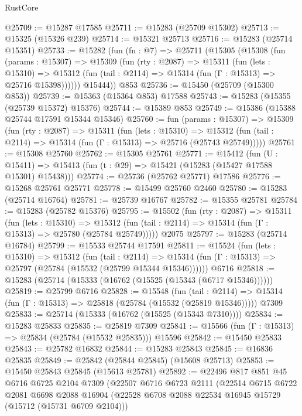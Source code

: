 \begin{lexlean}{RustCore}
\begin{coremodule}
@25709 := @15287 @17585
@25711 := @15283 (@25709 @15302)
@25713 := @15325 (@15326 @239)
@25714 := @15321 @25713
@25716 := @15283 (@25714 @15351)
@25733 := @15282
    (fun (fn : @7) =>
    @25711
      (@15305
        (@15308
          (fun (params : @15307) =>
          @15309
            (fun (rty : @2087) =>
            @15311
              (fun (lets : @15310) =>
              @15312 (fun (tail : @2114) => @15314 (fun (Γ : @15313) => @25716 @15398))))))
        @15444))
    @853
@25736 := @15450 (@25709 (@15300 @853))
@25739 := @15363 (@15364 @853) @17588
@25743 := @15283 (@15355 (@25739 @15372) @15376)
@25744 := @15389 @853
@25749 := @15386 (@15388 @25744 @17591 @15344 @15346)
@25760 := fun (params : @15307) =>
  @15309
    (fun (rty : @2087) =>
    @15311
      (fun (lets : @15310) =>
      @15312 (fun (tail : @2114) => @15314 (fun (Γ : @15313) => @25716 (@25743 @25749)))))
@25761 := @15308 @25760
@25762 := @15305 @25761
@25771 := @15412
    (fun (U : @15411) => @15413 (fun (t : @29) => @15421 (@15283 (@15427 @17588 @15301) @15438)))
@25774 := @25736 (@25762 @25771) @17586
@25776 := @15268 @25761 @25771
@25778 := @15499 @25760 @2460
@25780 := @15283 (@25714 @16764)
@25781 := @25739 @16767
@25782 := @15355 @25781
@25784 := @15283 (@25782 @15376)
@25795 := @15502
    (fun (rty : @2087) =>
    @15311
      (fun (lets : @15310) =>
      @15312 (fun (tail : @2114) => @15314 (fun (Γ : @15313) => @25780 (@25784 @25749)))))
    @2075
@25797 := @15283 (@25714 @16784)
@25799 := @15533 @25744 @17591
@25811 := @15524
    (fun (lets : @15310) =>
    @15312
      (fun (tail : @2114) =>
      @15314 (fun (Γ : @15313) => @25797 (@25784 (@15532 (@25799 @15344 @15346))))))
    @6716
@25818 := @15283 (@25714 (@15333 (@16762 (@15525 (@15343 (@6717 @15346))))))
@25819 := @25799 @6716
@25828 := @15548
    (fun (tail : @2114) => @15314 (fun (Γ : @15313) => @25818 (@25784 (@15532 (@25819 @15346)))))
    @7309
@25833 := @25714 (@15333 (@16762 (@15525 (@15343 @7310))))
@25834 := @15283 @25833
@25835 := @25819 @7309
@25841 := @15566 (fun (Γ : @15313) => @25834 (@25784 (@15532 @25835))) @15596
@25842 := @15450 @25833
@25843 := @25782 @16832
@25844 := @15283 @25843
@25845 := @16836 @25835
@25849 := @25842 (@25844 @25845) (@15608 @25713)
@25853 := @15450 @25843 @25845 (@15613 @25781)
@25892 := @22496
    @817
    @851
    @45
    @6716
    @6725
    @2104
    @7309
    (@22507
      @6716
      @6723
      @2111
      (@22514
        @6715
        @6722
        @2081
        @6698
        @2088
        @16904
        (@22528 @6708 @2088 @22534 @16945 @15729 (@15712 (@15731 @6709 @2104)))

\end{coremodule}
\end{lexlean}
